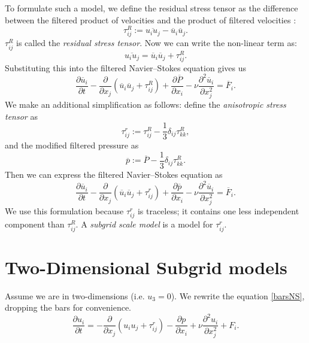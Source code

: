 \documentclass[11pt,a4paper]{article}
\begin{document}
To formulate such a model, we define the residual stress tensor as the difference between the filtered product of velocities and the product of filtered velocities \cite{Pope2000}:
$$\tau_{ij}^R := \overline{u_iu_j} - \overline{u}_i\overline{u}_j.$$
$\tau_{ij}^R$ is called the \emph{residual stress tensor}. Now we can write the non-linear term as:
$$\overline{u_iu_j} = \overline{u}_i\overline{u}_j+\tau_{ij}^R.$$
Substituting this into the filtered Navier--Stokes equation gives us
$$\frac{\partial \overline{u}_i}{\partial t} - \frac{\partial }{\partial x_j}\left(\overline{u}_i\overline{u}_j+\tau_{ij}^R \right)+\frac{\partial \overline{P}}{\partial x_i}- \nu \frac{\partial^2\overline{u}_i}{\partial x_j^2} = \overline{F}_i.$$
We make an additional simplification as follows: define the \emph{anisotropic stress tensor} as
$$\tau_{ij}^r := \tau_{ij}^R - \frac{1}{3}\delta_{ij}\tau_{kk}^R,$$
and the modified filtered pressure as
$$\overline{p} := \overline{P} - \frac{1}{3}\delta_{ij}\tau_{kk}^R.$$
Then we can express the filtered Navier--Stokes equation as
\begin{equation}\label{barsNS}
\frac{\partial \overline{u}_i}{\partial t} - \frac{\partial }{\partial x_j}\left(\overline{u}_i\overline{u}_j+\tau_{ij}^r \right)+\frac{\partial \overline{p}}{\partial x_i}- \nu \frac{\partial^2\overline{u}_i}{\partial x_j^2} = \overline{F}_i.
\end{equation}
We use this formulation because $\tau_{ij}^r$ is traceless; it contains one less independent component than $\tau_{ij}^R$. A \emph{subgrid scale model} is a model for $\tau_{ij}^r$.
\section{Two-Dimensional Subgrid models}
Assume we are in two-dimensions (i.e. $u_3=0$). We rewrite the equation \ref{barsNS}, dropping the bars for convenience.
\begin{equation}\label{filteredNS}
\frac{\partial {u}_i}{\partial t} =- \frac{\partial }{\partial x_j}\left({u}_i{u}_j +\tau_{ij}^r\right)-\frac{\partial {p}}{\partial x_i}+ \nu \frac{\partial^2u_i}{\partial x_j^2} + {F}_i.
\end{equation}
\end{document}
